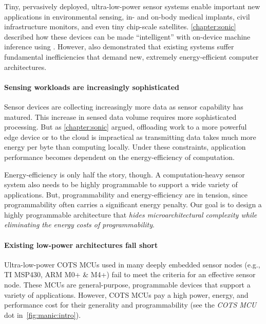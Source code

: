 Tiny, pervasively deployed, ultra-low-power sensor systems
enable important new applications in environmental sensing, in- and on-body
medical implants, civil infrastructure monitors, and even tiny chip-scale
satellites.
% 
\autoref{chapter:sonic} described how these devices can be made ``intelligent'' with on-device machine inference using \sonic.
% 
However, \sonic also demonstrated that existing systems suffer fundamental
inefficiencies that demand new, extremely energy-efficient computer
architectures. 

\paragraph{Sensing workloads are increasingly sophisticated} 
Sensor devices are collecting increasingly more data as sensor capability has matured.
% 
This increase in sensed data volume requires more sophisticated processing.
% 
But as \autoref{chapter:sonic} argued, offloading work to a more powerful edge device or to the cloud is impractical as transmitting data takes much more energy per byte than computing locally.
%
Under these constraints, application performance becomes dependent on the energy-efficiency of computation.
%

Energy-efficiency is only half the story, though.
% 
A computation-heavy sensor system also needs to be highly programmable to support a wide variety of applications.
% 
But, programmability and energy-efficiency are in tension, since programmability often carries a significant energy penalty.
% 
Our goal is to design a highly programmable architecture that \emph{hides microarchitectural complexity while eliminating the energy costs of programmability}.

\paragraph{Existing low-power architectures fall short}
Ultra-low-power COTS MCUs used in many deeply embedded sensor nodes
(e.g., TI MSP430, ARM M0+ \& M4+) fail
to meet the criteria for an effective sensor node.
%
These MCUs are general-purpose, programmable devices that support a variety of
applications.  
%
However, COTS MCUs pay a high power, energy, and performance cost for their
generality and programmability (see the \textit{COTS MCU} dot in~\autoref{fig:manic:intro}).  
%


